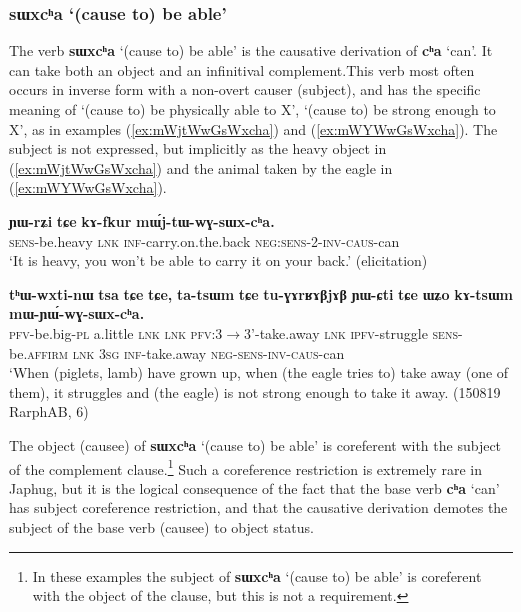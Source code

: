 \documentclass[oneside,a4paper,11pt]{article}
\newcommand{\ipa}[1]{\textbf{\phon#1}} %
\newcommand{\jpg}[2]{\ipa{#1} `#2'} %
\newcommand{\refb}[1]{(\ref{#1})}
\begin{document}
  \subsubsection{\jpg{sɯxcʰa}{(cause to) be able}} \label{sec:sWxcha}
The verb \jpg{sɯxcʰa}{(cause to) be able}  is the causative derivation of \jpg{cʰa}{can}.  It can take both an object and an infinitival complement.This verb most often occurs in inverse form with a non-overt causer (subject), and has the specific meaning of  `(cause to) be physically able to X', `(cause to) be strong enough to X', as in examples (\ref{ex:mWjtWwGsWxcha}) and (\ref{ex:mWYWwGsWxcha}). The subject is not expressed, but implicitly as the heavy object in \refb{ex:mWjtWwGsWxcha} and the animal taken by the eagle in \refb{ex:mWYWwGsWxcha}.

\begin{exe}
\ex \label{ex:mWjtWwGsWxcha}
\gll \ipa{ɲɯ-rʑi} 	\ipa{tɕe} 	\ipa{kɤ-fkur}  	\ipa{mɯ́j-tɯ-wɣ-sɯx-cʰa.} \\
\textsc{sens}-be.heavy \textsc{lnk}  \textsc{inf}-carry.on.the.back \textsc{neg:sens-2-inv-caus}-can \\
\glt `It is heavy, you won't be able to carry it on your back.' (elicitation)
\end{exe}	

  
\begin{exe}
\ex \label{ex:mWYWwGsWxcha}
\gll \ipa{tʰɯ-wxti-nɯ} 	\ipa{tsa} 	\ipa{tɕe} 	\ipa{tɕe,} 	\ipa{ta-tsɯm} 	\ipa{tɕe} 	\ipa{tu-ɣɤrʁɤβjɤβ} 	\ipa{ɲɯ-ɕti} 	\ipa{tɕe} 	\ipa{ɯʑo} 	\ipa{kɤ-tsɯm} 	\ipa{mɯ-ɲɯ́-wɣ-sɯx-cʰa.} \\
\textsc{pfv}-be.big-\textsc{pl} a.little \textsc{lnk}  \textsc{lnk} \textsc{pfv}:3$\rightarrow$3'-take.away \textsc{lnk} \textsc{ipfv}-struggle \textsc{sens}-be.\textsc{affirm}   \textsc{lnk} \textsc{3sg} \textsc{inf}-take.away \textsc{neg-sens-inv-caus}-can \\
\glt `When (piglets, lamb) have grown up, when (the eagle tries to) take away (one of them), it struggles and (the eagle) is not strong enough to take it away. (150819 RarphAB, 6)
\end{exe}	

The object (causee) of \jpg{sɯxcʰa}{(cause to) be able}  is coreferent with the subject of the complement clause.\footnote{In these examples the subject of \jpg{sɯxcʰa}{(cause to) be able} is coreferent with the object of the clause, but this is not a requirement.} Such a coreference restriction is extremely rare in Japhug, but it is the logical consequence of the fact that the base verb \jpg{cʰa}{can} has subject coreference restriction, and that the causative derivation demotes the subject of the base verb (causee) to object status.
\end{document}
